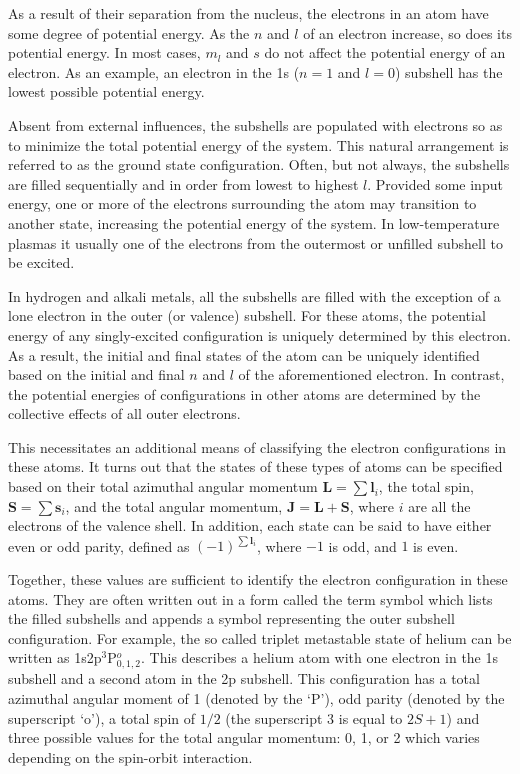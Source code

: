 As a result of their separation from the nucleus, the electrons in an atom have
some degree of potential energy. As the $n$ and $l$ of an electron increase, so
does its potential energy. In most cases, $m_l$ and $s$ do not affect the
potential energy of an electron. As an example, an electron in the 1s ($n=1$ and
$l=0$) subshell has the lowest possible potential energy.

Absent from external influences, the subshells are populated with electrons so
as to minimize the total potential energy of the system. This natural
arrangement is referred to as the ground state configuration. Often, but not
always, the subshells are filled sequentially and in order from lowest to
highest $l$. Provided some input energy, one or more of the electrons
surrounding the atom may transition to another state, increasing the potential
energy of the system. In low-temperature plasmas it usually one of the electrons
from the outermost or unfilled subshell to be excited.

In hydrogen and alkali metals, all the subshells are filled with the exception
of a lone electron in the outer (or valence) subshell. For these atoms, the
potential energy of any singly-excited configuration is uniquely determined by
this electron. As a result, the initial and final states of the atom can be
uniquely identified based on the initial and final $n$ and $l$ of the
aforementioned electron. In contrast, the potential energies of configurations
in other atoms are determined by the collective effects of all outer electrons.

This necessitates an additional means of classifying the electron configurations
in these atoms. It turns out that the states of these types of atoms can be
specified based on their total azimuthal angular momentum $\bm{L}=\sum \bm{l}_i$,
the total spin, $\bm{S}=\sum \bm{s}_i$, and the total angular momentum,
$\bm{J}=\bm{L}+\bm{S}$, where $i$ are all the electrons of the valence shell. In
addition, each state can be said to have either even or odd parity, defined as
$(-1)^{\sum\bm{l}_i}$, where $-1$ is odd, and $1$ is even.

Together, these values are sufficient to identify the electron configuration in
these atoms. They are often written out in a form called the term symbol which
lists the filled subshells and appends a symbol representing the outer subshell
configuration. For example, the so called triplet metastable state of helium can
be written as 1s2p$^3$P$^o_{0,1,2}$. This describes a helium atom with one
electron in the 1s subshell and a second atom in the 2p subshell. This
configuration has a total azimuthal angular moment of 1 (denoted by the `P'), odd
parity (denoted by the superscript `o'), a total spin of $1/2$ (the superscript
$3$ is equal to $2S+1$) and three possible values for the total angular
momentum: 0, 1, or 2 which varies depending on the spin-orbit interaction.

